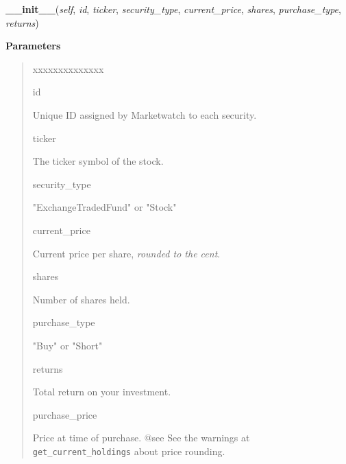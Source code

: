 \hspace{.8\funcindent}\begin{boxedminipage}{\funcwidth}

    \raggedright \textbf{\_\_init\_\_}(\textit{self}, \textit{id}, \textit{ticker}, \textit{security\_type}, \textit{current\_price}, \textit{shares}, \textit{purchase\_type}, \textit{returns})

\setlength{\parskip}{2ex}
\setlength{\parskip}{1ex}
      \textbf{Parameters}
      \vspace{-1ex}

      \begin{quote}
        \begin{Ventry}{xxxxxxxxxxxxxx}

          \item[id]

          Unique ID assigned by Marketwatch to each security.

          \item[ticker]

          The ticker symbol of the stock.

          \item[security\_type]

          "ExchangeTradedFund" or "Stock"

          \item[current\_price]

          Current price per share, \textit{rounded to the cent}.

          \item[shares]

          Number of shares held.

          \item[purchase\_type]

          "Buy" or "Short"

          \item[returns]

          Total return on your investment.

          \item[purchase\_price]

          Price at time of purchase. @see See the warnings at 
          \texttt{get\_current\_holdings} about price rounding.

        \end{Ventry}

      \end{quote}

    \end{boxedminipage}


